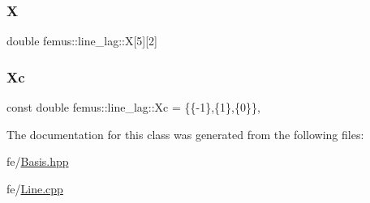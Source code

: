 \mbox{\label{classfemus_1_1line__lag_a05de5a2bda79830b789f13fb6ec70a8f}} 
\subsubsection{\texorpdfstring{X}{X}}
{\footnotesize\ttfamily double femus\+::line\+\_\+lag\+::X\mbox{[}5\mbox{]}\mbox{[}2\mbox{]}\hspace{0.3cm}{\ttfamily [protected]}}

\mbox{\label{classfemus_1_1line__lag_a4c321de90e3e4b98ab096433f7c52bae}} 
\subsubsection{\texorpdfstring{Xc}{Xc}}
{\footnotesize\ttfamily const double femus\+::line\+\_\+lag\+::\+Xc = \{\{-\/1\},\{1\},\{0\}\}\hspace{0.3cm}{\ttfamily [static]}, {\ttfamily [protected]}}



The documentation for this class was generated from the following files\+:\begin{DoxyCompactItemize}
\item 
fe/\mbox{\hyperlink{_basis_8hpp}{Basis.\+hpp}}\item 
fe/\mbox{\hyperlink{fe_2_line_8cpp}{Line.\+cpp}}\end{DoxyCompactItemize}
